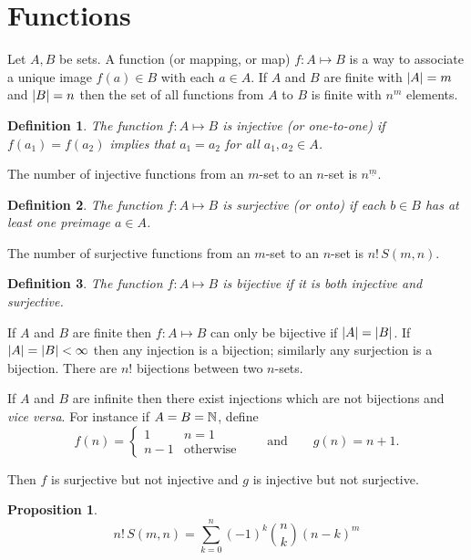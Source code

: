 \documentclass{notes}
\theoremstyle{plain}
\newtheorem*{definition}{Definition}
\newtheorem*{proposition}{Proposition}
\begin{document}
\section{Functions}

Let $A,B$ be sets.  A function (or mapping, or map) $f \colon A \mapsto B$
is a way to associate a unique image $f(a) \in B$ with each $a \in A$.  If
$A$ and $B$ are finite with $\left|A\right| = m$ and $\left|B\right| = n$ then the
set of all functions from $A$ to $B$ is finite with $n^m$ elements.

\begin{definition}
The function $f \colon A \mapsto B$ is injective (or one-to-one) if
$f(a_1) = f(a_2)$ implies that $a_1 = a_2$ for all $a_1, a_2 \in A$.
\end{definition}

The number of injective functions from an $m$-set to an $n$-set is
$n^{\underline{m}}$.

\begin{definition}
The function $f \colon A \mapsto B$ is surjective (or onto) if each
$b \in B$ has at least one preimage $a \in A$.
\end{definition}

The number of surjective functions from an $m$-set to an $n$-set is
$n!\, S(m,n)$.

\begin{definition}
The function $f \colon A \mapsto B$ is bijective if it is both injective
and surjective.
\end{definition}

If $A$ and $B$ are finite then $f \colon A \mapsto B$ can only be bijective
if $\left|A\right| = \left|B\right|$.  If $\left|A\right| = \left|B\right| < \infty$ then any
injection is a bijection; similarly any surjection is a bijection.  There
are $n!$ bijections between two $n$-sets.

If $A$ and $B$ are infinite then there exist injections which are not
bijections and \emph{vice versa}.  For instance if $A = B = \mathbb{N}$, define
\[
f(n) = \begin{cases}
1 & n = 1 \\
n-1 & \text{otherwise}
\end{cases} \qquad \text{and} \qquad
g(n) = n+1.
\]

Then $f$ is surjective but not injective and $g$ is injective but
not surjective.

\begin{proposition}
\[
n!\, S(m,n) = \sum_{k=0}^n (-1)^k \binom{n}{k} (n-k)^m
\]
\end{proposition}
\end{document}
